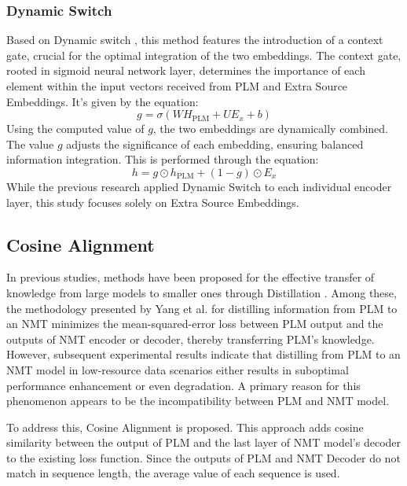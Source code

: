 \documentclass[conference]{IEEEtran}
\begin{document}
\subsubsection{Dynamic Switch}
Based on Dynamic switch \cite{Yang2019}, this method features the introduction of a context gate, crucial for the optimal integration of the two embeddings. The context gate, rooted in sigmoid neural network layer, determines the importance of each element within the input vectors received from PLM and Extra Source Embeddings. It's given by the equation:
\begin{equation}
g = \sigma(W H_{\text{PLM}} + U E_x + b)
\end{equation}
Using the computed value of \(g\), the two embeddings are dynamically combined. The value \(g\) adjusts the significance of each embedding, ensuring balanced information integration. This is performed through the equation:
\begin{equation}
h = g \odot h_{\text{PLM}} + (1 - g) \odot E_x
\end{equation}
While the previous research \cite{Yang2019} applied Dynamic Switch to each individual encoder layer, this study focuses solely on Extra Source Embeddings.

\subsection{Cosine Alignment}
In previous studies, methods have been proposed for the effective transfer of knowledge from large models to smaller ones through Distillation \cite{Hinton2015, Yang2019, weng2020acquiring}. Among these, the methodology presented by Yang et al. \cite{Yang2019} for distilling information from PLM to an NMT minimizes the mean-squared-error loss between PLM output and the outputs of NMT encoder or decoder, thereby transferring PLM's knowledge. However, subsequent experimental results indicate that distilling from PLM to an NMT model in low-resource data scenarios either results in suboptimal performance enhancement or even degradation. A primary reason for this phenomenon appears to be the incompatibility between PLM and NMT model.

To address this, Cosine Alignment is proposed. This approach adds cosine similarity between the output of PLM and the last layer of NMT model's decoder to the existing loss function. Since the outputs of PLM and NMT Decoder do not match in sequence length, the average value of each sequence is used.
\end{document}
